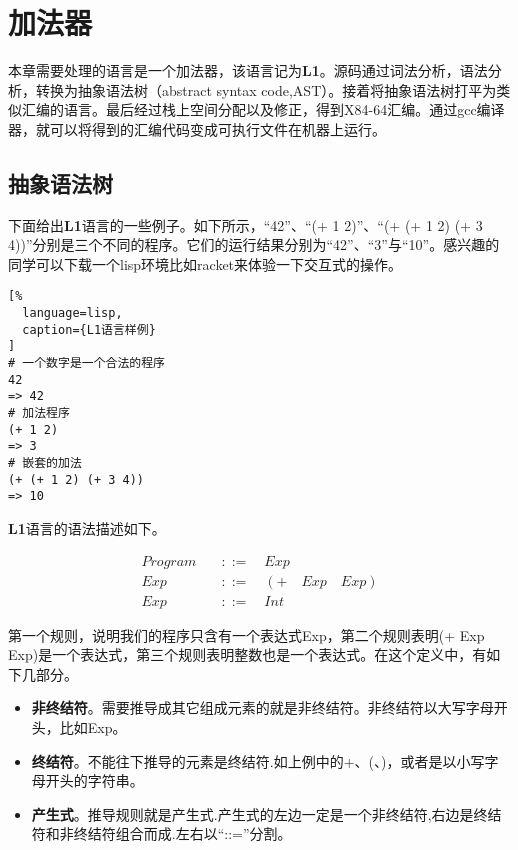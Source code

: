 \chapter{加法器}

本章需要处理的语言是一个加法器，该语言记为\textbf{L1}。源码通过词法分析，语法分析，转换为抽象语法树（abstract syntax code,AST）。接着将抽象语法树打平为类似汇编的语言。最后经过栈上空间分配以及修正，得到X84-64汇编。通过gcc编译器，就可以将得到的汇编代码变成可执行文件在机器上运行。

\section{抽象语法树}

下面给出\textbf{L1}语言的一些例子。如下所示，“42”、“(+ 1 2)”、“(+ (+ 1 2) (+ 3 4))”分别是三个不同的程序。它们的运行结果分别为“42”、“3”与“10”。感兴趣的同学可以下载一个lisp环境比如racket来体验一下交互式的操作。

\begin{lstlisting}[%
  language=lisp,
  caption={L1语言样例}
]
# 一个数字是一个合法的程序
42
=> 42
# 加法程序
(+ 1 2)
=> 3
# 嵌套的加法
(+ (+ 1 2) (+ 3 4))
=> 10
\end{lstlisting}


\textbf{L1}语言的语法描述如下。

\begin{equation}
\begin{aligned}
  \label{eq:1}
   Program \quad &::= \quad Exp \\
   Exp \quad &::= \quad (+ \quad Exp \quad Exp) \\
   Exp \quad &::=  \quad Int
\end{aligned}
\end{equation}

第一个规则，说明我们的程序只含有一个表达式Exp，第二个规则表明(+ Exp Exp)是一个表达式，第三个规则表明整数也是一个表达式。在这个定义中，有如下几部分。

\begin{itemize}
  \item \textbf{非终结符}。需要推导成其它组成元素的就是非终结符。非终结符以大写字母开头，比如Exp。
  \item \textbf{终结符}。不能往下推导的元素是终结符.如上例中的+、(、)，或者是以小写字母开头的字符串。
  \item \textbf{产生式}。推导规则就是产生式.产生式的左边一定是一个非终结符,右边是终结符和非终结符组合而成.左右以“::=”分割。
\end{itemize}

